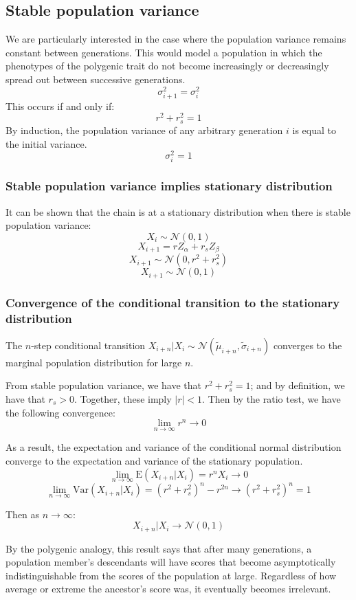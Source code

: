 \documentclass[a4paper,11pt]{article}
\begin{document}
\subsection{Stable population variance}
We are particularly interested in the case where the population variance remains constant between generations. This would model a population in which the phenotypes of the polygenic trait do not become increasingly or decreasingly spread out between successive generations. 
$$\sigma_{i+1}^2 = \sigma_i^2$$
This occurs if and only if:
$$r^2+r_s^2 = 1$$
%
By induction, the population variance of any arbitrary generation $i$ is equal to the initial variance. 
$$\sigma_i^2 = 1$$

\subsubsection{Stable population variance implies stationary distribution}
It can be shown that the chain is at a stationary distribution when there is stable population variance:
$$X_i \sim \mathcal{N}(0, 1)$$
$$X_{i+1} = r Z_\alpha + r_s Z_\beta$$
$$X_{i+1} \sim \mathcal{N}(0, r^2+r_s^2)$$
$$X_{i+1} \sim \mathcal{N}(0, 1)$$

\subsubsection{Convergence of the conditional transition to the stationary distribution}
The $n$-step conditional transition $X_{i+n}|X_i \sim \mathcal{N}( \tilde{\mu}_{i+n}, \tilde{\sigma}_{i+n})$ converges to the marginal population distribution for large $n$. 

From stable population variance, we have that $r^2 + r_s^2 = 1$; and by definition, we have that $r_s > 0$. Together, these imply $|r| < 1$. Then by the ratio test, we have the following convergence:
$$\lim_{n\to\infty} r^n \rightarrow 0$$

As a result, the expectation and variance of the conditional normal distribution converge to the expectation and variance of the stationary population.
$$\lim_{n\to\infty} \mathrm{E}(X_{i+n}|X_i) = r^nX_i \rightarrow 0$$
$$\lim_{n\to\infty} \mathrm{Var}(X_{i+n}|X_i) = (r^2+r_s^2)^n-r^{2n} \rightarrow (r^2+r_s^2)^n = 1$$

Then as $n \rightarrow \infty$:
$$X_{i+n}|X_i \rightarrow \mathcal{N}(0, 1)$$

By the polygenic analogy, this result says that after many generations, a population member's descendants will have scores that become asymptotically indistinguishable from the scores of the population at large. Regardless of how average or extreme the ancestor's score was, it eventually becomes irrelevant.
\end{document}
